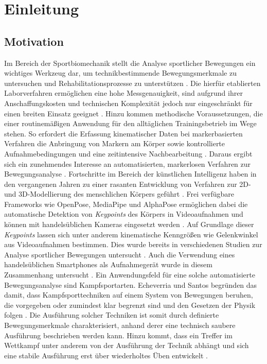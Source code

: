 \documentclass[intern]{cgMA}
\begin{document}
\tableofcontents
\clearpage
\section{Einleitung}
\subsection{Motivation}
Im Bereich der Sportbiomechanik stellt die Analyse sportlicher Bewegungen ein wichtiges Werkzeug dar, um technikbestimmende Bewegungsmerkmale zu untersuchen und Rehabilitationsprozesse zu unterstützen \cite{Colyer2018}. Die hierfür etablierten Laborverfahren ermöglichen eine hohe Messgenauigkeit, sind aufgrund ihrer Anschaffungskosten und technischen Komplexität jedoch nur eingeschränkt für einen breiten Einsatz geeignet \cite{Edriss2025}. Hinzu kommen methodische Voraussetzungen, die einer routinemäßigen Anwendung für den alltäglichen Trainingsbetrieb im Wege stehen. So erfordert die Erfassung kinematischer Daten bei markerbasierten Verfahren die Anbringung von Markern am Körper sowie kontrollierte Aufnahmebedingungen und eine zeitintensive Nachbearbeitung \cite{Colyer2018}. Daraus ergibt sich ein zunehmendes Interesse an automatisierten, markerlosen Verfahren zur Bewegungsanalyse \cite{Colyer2018}.
Fortschritte im Bereich der künstlichen Intelligenz haben in den vergangenen Jahren zu einer rasanten Entwicklung von Verfahren zur 2D- und 3D-Modellierung des menschlichen Körpers geführt \cite{Edriss2025}. Frei verfügbare Frameworks wie OpenPose, MediaPipe und AlphaPose ermöglichen dabei die automatische Detektion von \textit{Keypoints} des Körpers in Videoaufnahmen und können mit handelsüblichen Kameras eingesetzt werden \cite{Edriss2025}. Auf Grundlage dieser \textit{Keypoints} lassen sich unter anderem kinematische Kenngrößen wie Gelenkwinkel aus Videoaufnahmen bestimmen. Dies wurde bereits in verschiedenen Studien zur Analyse sportlicher Bewegungen untersucht \cite{Edriss2025}. Auch die Verwendung eines handelsüblichen Smartphones als Aufnahmegerät wurde in diesem Zusammenhang untersucht \cite{Babouras2024}.
Ein Anwendungsfeld für eine solche automatisierte Bewegungsanalyse sind Kampfsportarten. Echeverria und Santos \cite{Echeverria2021} begründen das damit, dass Kampfsporttechniken auf einem System von Bewegungen beruhen, die vorgegeben oder zumindest klar begrenzt sind und den Gesetzen der Physik folgen \cite{Echeverria2021}. Die Ausführung solcher Techniken ist somit durch definierte Bewegungsmerkmale charakterisiert, anhand derer eine technisch saubere Ausführung beschrieben werden kann. Hinzu kommt, dass ein Treffer im Wettkampf unter anderem von der Ausführung der Technik abhängt und sich eine stabile Ausführung erst über wiederholtes Üben entwickelt \cite{Echeverria2021}.
\end{document}
